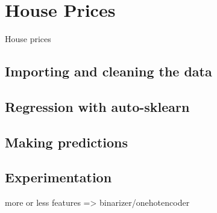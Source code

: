 \documentclass[a4paper, 12pt, twoside]{report}
\begin{document}
\clearpage

\section{House Prices}
\label{sec:regression}
House prices

\subsection{Importing and cleaning the data}

\subsection{Regression with auto-sklearn}

\subsection{Making predictions}

\subsection{Experimentation}
more or less features => binarizer/onehotencoder
\end{document}
